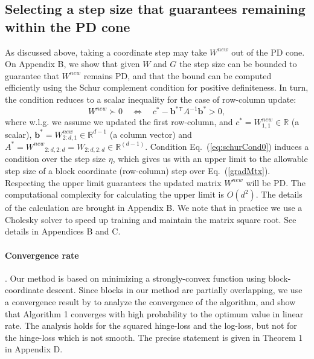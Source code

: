 \documentclass[twoside,11pt]{article}
\newcommand\mat[1]{{#1}}
\renewcommand\vec[1]{\mathbf{#1}}
\newcommand{\T}{{}^\mathsf{T}}
\newcommand{\W}{\mat{W}}
\newcommand{\newW}{{\mat{W^{new}}}}
\newcommand{\R}{\mathbb{R}}
\newcommand{\cholL}{\mat{L}}
\newcommand{\B}{\vec{b}}
\newcommand{\C}{c}
\newcommand{\invA}{A^{-1}}
\newcommand{\Wvec}{\W_{2:d,1}}
\newcommand{\Wscalar}{\W_{1,1}}
\renewcommand{\eqref}[1]{Eq.~(\ref{#1})}
\begin{document}
\subsection{Selecting a step size that guarantees remaining within the PD cone}\label{subsec:step} \vskip -4pt
As discussed above, taking a coordinate step may take $\newW$ out of the PD cone. On Appendix B, we show that given $\W$ and $\mat{G}$ the step size can be bounded to guarantee that $\newW$ remains PD, and that the bound can be computed efficiently using the Schur complement condition for positive definiteness. In turn, the condition reduces to a scalar inequality for the case of row-column update:
\begin{equation}\label{eq:schurCond0}
  \newW \succ  0 \quad \Leftrightarrow \quad  \C^* - \B^*\T \invA \B^* >  0,
\end{equation}
where w.l.g. we assume we updated the first row-column, and $\C^* = \Wscalar^{new} \in \R$ (a scalar), $\B^* = \Wvec^{new} \in \R^{d-1}$ (a column vector) and $A^* = \newW_{2:d,2:d} = \W_{2:d,2:d}\in \R^{(d-1)}$. Condition \eqref{eq:schurCond0} induces a condition over the step size $\eta$, which gives us with an upper limit to the allowable step size of a block coordinate (row-column) step over \eqref{gradMtx}. Respecting the upper limit guarantees the updated matrix $\W^{new}$ will be PD. The computational complexity for calculating the upper limit is $O(d^2)$. The details of the calculation are brought in Appendix B. We note that in practice we use a Cholesky solver \citep{CHOLMOD} to speed up training and maintain the matrix square root. See details in Appendices B and C.
\paragraph{Convergence rate}.
Our method is based on minimizing a strongly-convex function using block-coordinate descent. Since blocks in our method are partially overlapping, we use a convergence result by \citet{richtarik2013optimal} to analyze the convergence of the algorithm, and show that Algorithm 1 converges with high probability to the optimum value in linear rate. The analysis holds for the squared hinge-loss and the log-loss, but not for the hinge-loss which is not smooth. The precise statement is given in Theorem 1 in Appendix D.
\end{document}
